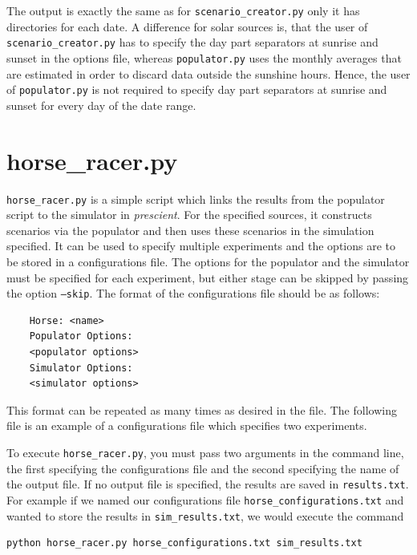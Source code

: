 \documentclass[11pt]{article}
\begin{document}
The output is exactly the same as for \texttt{scenario\_creator.py} only it has directories for each date.
A difference for solar sources is, that the user of \texttt{scenario\_creator.py} has to specify the day part separators at sunrise and sunset in the options file, whereas \texttt{populator.py} uses the monthly averages that are estimated in order to discard data outside the sunshine hours. Hence, the user of \texttt{populator.py} is not required to specify day part separators at sunrise and sunset for every day of the date range.

\section{horse\_racer.py}\label{sec:horse_racer}

\texttt{horse\_racer.py} is a simple script which links the results from the populator script to the simulator in \textit{prescient}. For the specified sources, it constructs scenarios via
the populator and then uses these scenarios in the simulation specified.
It can be used to specify multiple experiments and the options are to be stored in a configurations file. The options for the populator and the simulator must be specified for each experiment, but either stage can be skipped by passing the option \texttt{--skip}. The format of the configurations file should be as follows:

\begin{verbatim}
	Horse: <name>
	Populator Options:
	<populator options>
	Simulator Options:
	<simulator options>
\end{verbatim}

This format can be repeated as many times as desired in the file. The following file is an example of a configurations file which specifies two experiments.

\begin{framed}
	
\end{framed}


To execute \texttt{horse\_racer.py}, you must pass two arguments in the command line, the first specifying the configurations file and the second specifying the name of the output file. If no output file is specified, the results are saved in \texttt{results.txt}. For example if we named our configurations file \texttt{horse\_configurations.txt} and wanted to store the results in \texttt{sim\_results.txt}, we would execute the command

\begin{verbatim}
python horse_racer.py horse_configurations.txt sim_results.txt
\end{verbatim}
\end{document}

